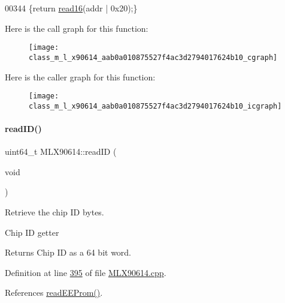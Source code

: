 \begin{DoxyCode}
00344 \{\textcolor{keywordflow}{return} \mbox{\hyperlink{class_m_l_x90614_ad7fb030682918c5c9ae6292962527b44}{read16}}(addr | 0x20);\}
\end{DoxyCode}
Here is the call graph for this function\+:\nopagebreak
\begin{figure}[H]
\begin{center}
\leavevmode
\texttt{[image: class\_m\_l\_x90614\_aab0a010875527f4ac3d2794017624b10\_cgraph]}
\end{center}
\end{figure}
Here is the caller graph for this function\+:\nopagebreak
\begin{figure}[H]
\begin{center}
\leavevmode
\texttt{[image: class\_m\_l\_x90614\_aab0a010875527f4ac3d2794017624b10\_icgraph]}
\end{center}
\end{figure}
\mbox{\label{class_m_l_x90614_a352cc543f3e417d6318b6152d872db2e}} 
\paragraph{\texorpdfstring{read\+I\+D()}{readID()}}
{\footnotesize\ttfamily uint64\+\_\+t M\+L\+X90614\+::read\+ID (\begin{DoxyParamCaption}\item[{void}]{ }\end{DoxyParamCaption})}



Retrieve the chip ID bytes. 

Chip ID getter

\begin{DoxyReturn}{Returns}
Chip ID as a 64 bit word. 
\end{DoxyReturn}


Definition at line \mbox{\hyperlink{_m_l_x90614_8cpp_source_l00395}{395}} of file \mbox{\hyperlink{_m_l_x90614_8cpp_source}{M\+L\+X90614.\+cpp}}.



References \mbox{\hyperlink{_m_l_x90614_8cpp_source_l00344}{read\+E\+E\+Prom()}}.



